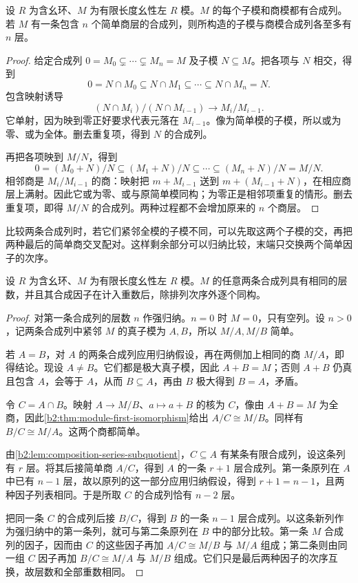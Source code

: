 \begin{lemma}\label{b2:lem:composition-series-subquotient}
	设 \(R\) 为含幺环、\(M\) 为有限长度幺性左 \(R\) 模。\(M\) 的每个子模和商模都有合成列。若 \(M\) 有一条包含 \(n\) 个简单商层的合成列，则所构造的子模与商模合成列各至多有 \(n\) 层。
\end{lemma}
\begin{proof}
	给定合成列 \(0=M_0\subsetneq\cdots\subsetneq M_n=M\) 及子模 \(N\subseteq M\)。把各项与 \(N\) 相交，得到
	\[
		0=N\cap M_0\subseteq N\cap M_1\subseteq\cdots\subseteq N\cap M_n=N.
	\]
	包含映射诱导
	\[
		(N\cap M_i)/(N\cap M_{i-1})\longrightarrow M_i/M_{i-1}.
	\]
	它单射，因为映到零正好要求代表元落在 \(M_{i-1}\)。像为简单模的子模，所以或为零、或为全体。删去重复项，得到 \(N\) 的合成列。

	再把各项映到 \(M/N\)，得到
	\[
		0=(M_0+N)/N\subseteq(M_1+N)/N\subseteq\cdots\subseteq(M_n+N)/N=M/N.
	\]
	相邻商是 \(M_i/M_{i-1}\) 的商：映射把 \(m+M_{i-1}\) 送到 \(m+(M_{i-1}+N)\)，在相应商层上满射。因此它或为零、或与原简单模同构；为零正是相邻项重复的情形。删去重复项，即得 \(M/N\) 的合成列。两种过程都不会增加原来的 \(n\) 个商层。
\end{proof}

比较两条合成列时，若它们紧邻全模的子模不同，可以先取这两个子模的交，再把两种最后的简单商交叉配对。这样剩余部分可以归纳比较，末端只交换两个简单因子的次序。

\begin{theorem}\label{b2:thm:module-jordan-holder}
	设 \(R\) 为含幺环、\(M\) 为有限长度幺性左 \(R\) 模。\(M\) 的任意两条合成列具有相同的层数，并且其合成因子在计入重数后，除排列次序外逐个同构。
\end{theorem}
\begin{proof}
	对第一条合成列的层数 \(n\) 作强归纳。\(n=0\) 时 \(M=0\)，只有空列。设 \(n>0\)，记两条合成列中紧邻 \(M\) 的真子模为 \(A,B\)，所以 \(M/A,M/B\) 简单。

	若 \(A=B\)，对 \(A\) 的两条合成列应用归纳假设，再在两侧加上相同的商 \(M/A\)，即得结论。现设 \(A\ne B\)。它们都是极大真子模，因此 \(A+B=M\)；否则 \(A+B\) 仍真且包含 \(A\)，会等于 \(A\)，从而 \(B\subseteq A\)，再由 \(B\) 极大得到 \(B=A\)，矛盾。

	令 \(C=A\cap B\)。映射 \(A\rightarrow M/B\)、\(a\mapsto a+B\) 的核为 \(C\)，像由 \(A+B=M\) 为全商，因此\cref{b2:thm:module-first-isomorphism}给出 \(A/C\cong M/B\)。同样有 \(B/C\cong M/A\)。这两个商都简单。

	由\cref{b2:lem:composition-series-subquotient}，\(C\subseteq A\) 有某条有限合成列，设这条列有 \(r\) 层。将其后接简单商 \(A/C\)，得到 \(A\) 的一条 \(r+1\) 层合成列。第一条原列在 \(A\) 中已有 \(n-1\) 层，故以原列的这一部分应用归纳假设，得到 \(r+1=n-1\)，且两种因子列表相同。于是所取 \(C\) 的合成列恰有 \(n-2\) 层。

	把同一条 \(C\) 的合成列后接 \(B/C\)，得到 \(B\) 的一条 \(n-1\) 层合成列。以这条新列作为强归纳中的第一条列，就可与第二条原列在 \(B\) 中的部分比较。第一条 \(M\) 合成列的因子，因而由 \(C\) 的这些因子再加 \(A/C\cong M/B\) 与 \(M/A\) 组成；第二条则由同一组 \(C\) 因子再加 \(B/C\cong M/A\) 与 \(M/B\) 组成。它们只是最后两种因子的次序互换，故层数和全部重数相同。
\end{proof}

